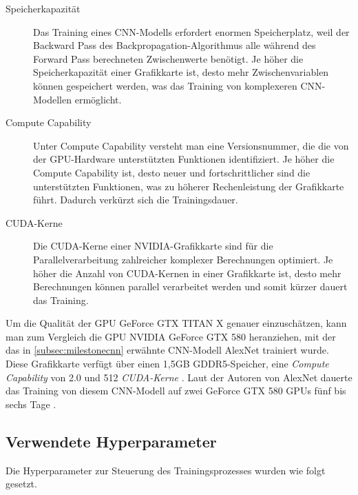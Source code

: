 \begin{description}
	\item[Speicherkapazität]

	Das Training eines CNN-Modells erfordert enormen Speicherplatz, weil der Backward Pass des Backpropagation-Algorithmus alle während des Forward Pass berechneten Zwischenwerte benötigt. Je höher die Speicherkapazität einer Grafikkarte ist, desto mehr Zwischenvariablen können gespeichert werden, was das Training von komplexeren CNN-Modellen ermöglicht.
	
	\item[Compute Capability] 
	
	Unter Compute Capability versteht man eine Versionsnummer, die die von der GPU-Hardware unterstützten Funktionen identifiziert. Je höher die Compute Capability ist, desto neuer und fortschrittlicher sind die unterstützten Funktionen, was zu höherer Rechenleistung der Grafikkarte führt. Dadurch verkürzt sich die Trainingsdauer.
	
	\item[CUDA-Kerne] 
	
	Die CUDA-Kerne einer NVIDIA-Grafikkarte sind für die Parallelverarbeitung zahlreicher komplexer Berechnungen optimiert. Je höher die Anzahl von CUDA-Kernen in einer Grafikkarte ist, desto mehr Berechnungen können parallel verarbeitet werden und somit kürzer dauert das Training.
\end{description}

Um die Qualität der GPU GeForce GTX TITAN X genauer einzuschätzen, kann man zum Vergleich die GPU NVIDIA GeForce GTX 580 heranziehen, mit der das in \autoref{subsec:milestonecnn} erwähnte CNN-Modell AlexNet trainiert wurde. Diese Grafikkarte verfügt über einen 1,5GB GDDR5-Speicher, eine \emph{Compute Capability} von 2.0 und 512 \emph{CUDA-Kerne} \cite{gtx580}. Laut der Autoren von AlexNet dauerte das Training von diesem CNN-Modell auf zwei GeForce GTX 580 GPUs fünf bis sechs Tage \cite[7]{10.1145/3065386}.

\subsection{Verwendete Hyperparameter}

Die Hyperparameter zur Steuerung des Trainingsprozesses wurden wie folgt gesetzt.

